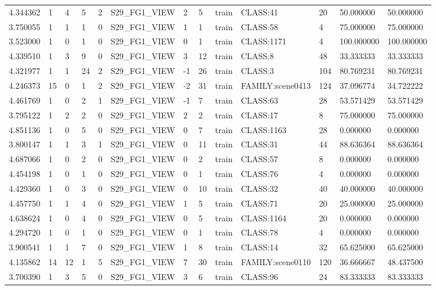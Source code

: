 \begin{tabular}{lllllllllllll}
4.344362 & 1 & 4 & 5 & 2 & S29\_FG1\_VIEW & 2 & 5 & train & CLASS:41 & 20 & 50.000000 & 50.000000 \\
3.750055 & 1 & 1 & 1 & 0 & S29\_FG1\_VIEW & 1 & 1 & train & CLASS:58 & 4 & 75.000000 & 75.000000 \\
3.523000 & 1 & 0 & 1 & 0 & S29\_FG1\_VIEW & 0 & 1 & train & CLASS:1171 & 4 & 100.000000 & 100.000000 \\
4.339510 & 1 & 3 & 9 & 0 & S29\_FG1\_VIEW & 3 & 12 & train & CLASS:8 & 48 & 33.333333 & 33.333333 \\
4.321977 & 1 & 1 & 24 & 2 & S29\_FG1\_VIEW & -1 & 26 & train & CLASS:3 & 104 & 80.769231 & 80.769231 \\
4.246373 & 15 & 0 & 1 & 2 & S29\_FG1\_VIEW & -2 & 31 & train & FAMILY:scene0413 & 124 & 37.096774 & 34.722222 \\
4.461769 & 1 & 0 & 2 & 1 & S29\_FG1\_VIEW & -1 & 7 & train & CLASS:63 & 28 & 53.571429 & 53.571429 \\
3.795122 & 1 & 2 & 2 & 0 & S29\_FG1\_VIEW & 2 & 2 & train & CLASS:17 & 8 & 75.000000 & 75.000000 \\
4.851136 & 1 & 0 & 5 & 0 & S29\_FG1\_VIEW & 0 & 7 & train & CLASS:1163 & 28 & 0.000000 & 0.000000 \\
3.800147 & 1 & 1 & 3 & 1 & S29\_FG1\_VIEW & 0 & 11 & train & CLASS:31 & 44 & 88.636364 & 88.636364 \\
4.687066 & 1 & 0 & 2 & 0 & S29\_FG1\_VIEW & 0 & 2 & train & CLASS:57 & 8 & 0.000000 & 0.000000 \\
4.454198 & 1 & 0 & 1 & 0 & S29\_FG1\_VIEW & 0 & 1 & train & CLASS:76 & 4 & 0.000000 & 0.000000 \\
4.429360 & 1 & 0 & 3 & 0 & S29\_FG1\_VIEW & 0 & 10 & train & CLASS:32 & 40 & 40.000000 & 40.000000 \\
4.457750 & 1 & 1 & 4 & 0 & S29\_FG1\_VIEW & 1 & 5 & train & CLASS:71 & 20 & 25.000000 & 25.000000 \\
4.638624 & 1 & 0 & 4 & 0 & S29\_FG1\_VIEW & 0 & 5 & train & CLASS:1164 & 20 & 0.000000 & 0.000000 \\
4.294720 & 1 & 0 & 1 & 0 & S29\_FG1\_VIEW & 0 & 1 & train & CLASS:78 & 4 & 0.000000 & 0.000000 \\
3.900541 & 1 & 1 & 7 & 0 & S29\_FG1\_VIEW & 1 & 8 & train & CLASS:14 & 32 & 65.625000 & 65.625000 \\
4.135862 & 14 & 12 & 1 & 5 & S29\_FG1\_VIEW & 7 & 30 & train & FAMILY:scene0110 & 120 & 36.666667 & 48.437500 \\
3.700390 & 1 & 3 & 5 & 0 & S29\_FG1\_VIEW & 3 & 6 & train & CLASS:96 & 24 & 83.333333 & 83.333333 \\

\end{tabular}
